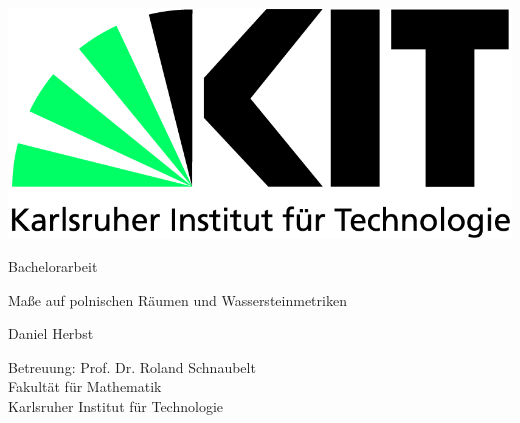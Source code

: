 \documentclass[a4paper]{article}
\begin{document}
	
	\newcommand{\chapteramount}{1}
	
  	\pagestyle{empty}
  	
  	
  	
  	

  	\begin{titlepage}

    	\includegraphics[scale=0.45]{../resources/kit-logo.jpg} 
    	\vspace*{2cm} 

 		\begin{center} \large 
    
    		Bachelorarbeit
    		\vspace*{2cm}

    		{\huge Maße auf polnischen Räumen und Wassersteinmetriken}
    		\vspace*{2cm}

    		Daniel Herbst
    		\vspace*{1cm}

    		\vspace*{4cm}


    		Betreuung: Prof. Dr. Roland Schnaubelt \\[1cm]
    		Fakultät für Mathematik \\[1cm]
			Karlsruher Institut für Technologie
		
  		\end{center}
  	
	\end{titlepage}


 	 
 	 
 	
\end{document}
